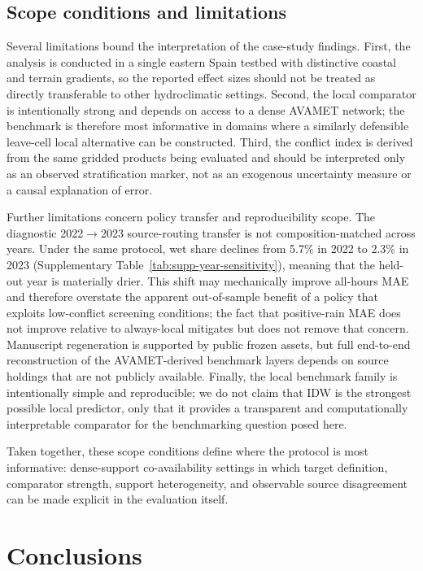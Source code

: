 \documentclass[preprint,12pt]{elsarticle}
\begin{document}
\subsection{Scope conditions and limitations}

Several limitations bound the interpretation of the case-study findings. First, the analysis is conducted in a single eastern Spain testbed with distinctive coastal and terrain gradients, so the reported effect sizes should not be treated as directly transferable to other hydroclimatic settings. Second, the local comparator is intentionally strong and depends on access to a dense AVAMET network; the benchmark is therefore most informative in domains where a similarly defensible leave-cell local alternative can be constructed. Third, the conflict index is derived from the same gridded products being evaluated and should be interpreted only as an observed stratification marker, not as an exogenous uncertainty measure or a causal explanation of error.

Further limitations concern policy transfer and reproducibility scope. The diagnostic 2022$\rightarrow$2023 source-routing transfer is not composition-matched across years. Under the same protocol, wet share declines from 5.7\% in 2022 to 2.3\% in 2023 (Supplementary Table~\ref{tab:supp-year-sensitivity}), meaning that the held-out year is materially drier. This shift may mechanically improve all-hours MAE and therefore overstate the apparent out-of-sample benefit of a policy that exploits low-conflict screening conditions; the fact that positive-rain MAE does not improve relative to always-local mitigates but does not remove that concern. Manuscript regeneration is supported by public frozen assets, but full end-to-end reconstruction of the AVAMET-derived benchmark layers depends on source holdings that are not publicly available. Finally, the local benchmark family is intentionally simple and reproducible; we do not claim that IDW is the strongest possible local predictor, only that it provides a transparent and computationally interpretable comparator for the benchmarking question posed here.

Taken together, these scope conditions define where the protocol is most informative: dense-support co-availability settings in which target definition, comparator strength, support heterogeneity, and observable source disagreement can be made explicit in the evaluation itself.

\section{Conclusions}
\end{document}
